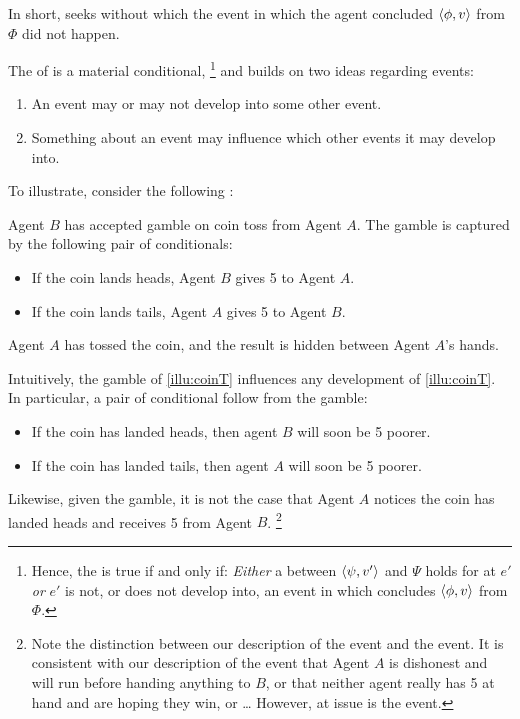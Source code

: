 \begin{note}
  \noindent%
  In short, \qWhyV{} seeks \ros{} without which the event in which the agent concluded \(\langle \phi, v \rangle\) from \(\Phi\) did not happen.

  The \itc{} of \qWhyV{} is a material conditional,%
  \footnote{
    Hence, the \itc{} is true if and only if: \emph{Either} a  between \(\langle \psi, v' \rangle\) and \(\Psi\) holds for \vAgent{} at \(e'\) \emph{or} \(e'\) is not, or does not develop into, an event in which \vAgent{} concludes \(\langle \phi, v \rangle\) from \(\Phi\).
  }
  and builds on two ideas regarding events:
  \begin{enumerate}
  \item
    An event may or may not develop into some other event.
  \item
    Something about an event may influence which other events it may develop into.
  \end{enumerate}
  To illustrate, consider the following :

  \begin{scenario}%
    \label{illu:coinT}%
    Agent \(B\) has accepted gamble on coin toss from Agent \(A\).
    The gamble is captured by the following pair of conditionals:
    \begin{itemize}
    \item
      If the coin lands heads, Agent \(B\) gives \texteuro{}5 to Agent \(A\).
    \item
      If the coin lands tails, Agent \(A\) gives \texteuro{}5 to Agent \(B\).
    \end{itemize}
    Agent \(A\) has tossed the coin, and the result is hidden between Agent \(A\)'s hands.
  \end{scenario}

  \noindent%
  Intuitively, the gamble of \autoref{illu:coinT} influences any development of \autoref{illu:coinT}.
  In particular, a pair of conditional follow from the gamble:
  \begin{itemize}
  \item
    If the coin has landed heads, then agent \(B\) will soon be \texteuro{}5 poorer.
  \item
    If the coin has landed tails, then agent \(A\) will soon be \texteuro{}5 poorer.
  \end{itemize}
  Likewise, given the gamble, it is not the case that Agent \(A\) notices the coin has landed heads and receives \texteuro{}5 from Agent \(B\).%
  \footnote{
    \label{fn:desc-con-caveat}
    Note the distinction between our description of the event and the event.
    It is consistent with our description of the event that Agent \(A\) is dishonest and will run before handing anything to \(B\), or that neither agent really has \texteuro{}5 at hand and are hoping they win, or \dots
    However, at issue is the event.
  }


\end{note}
